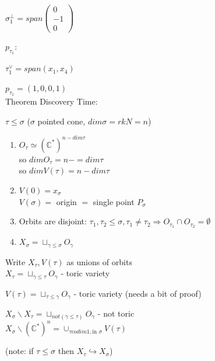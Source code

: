 \documentclass[a4paper,12pt]{amsart}
\newcommand{\C}{\ensuremath{\mathbb{C}}}
\begin{document}
$\sigma_1^\perp = span \left( \begin{array}{c}  0 \\ -1 \\ 0 \end{array}  \right)$

$ p_{\tau_1}:$

$\tau_1^\vee=span(x_1,x_4)$

$p_{\tau_1}=(1,0,0,1) $
\\

Theorem Discovery Time:

$\tau\leq \sigma$ ($\sigma$ pointed cone, $dim
\sigma= rkN=n$)
\begin{enumerate}[1)]
\item $O_\tau \simeq (\C^*)^{n-dim\tau}$\\
so  $ dim O_\tau= n-=dim\tau $\\
so $dimV(\tau) =n-dim\tau$
\item $ V(0)=x_\sigma $\\
$ V(\sigma) =  $ origin $=$ single point $P_\sigma$
\item Orbits are disjoint: $ \tau_1, \tau_2 \leq \sigma, \tau_1\neq \tau_2 \Rightarrow O_{\tau_1} \cap O_{\tau_2} = \emptyset $
\item $ X_\sigma = \sqcup _{\gamma\leq \sigma} O_\gamma $
\end{enumerate}
Write $ X_\tau, V(\tau) $ as unions of orbits
\\

$X_\tau=\sqcup_{\gamma\leq \tau} O_\gamma$ - toric variety

$ V(\tau) = \sqcup_{\tau\leq \gamma} O_\gamma $ - toric variety (needs a bit of proof)

$ X_\sigma\backslash X_\tau =\sqcup_{not(\gamma\leq \tau)}O_\gamma $ - not toric
\\

$ X_\sigma \backslash (\C^*)^n = \cup_{\tau codim 1, \text{in }\sigma} V(\tau) $

(note: if $ \tau \leq \sigma$ then $ X_\tau \hookrightarrow X_\sigma $)
\\
\end{document}
